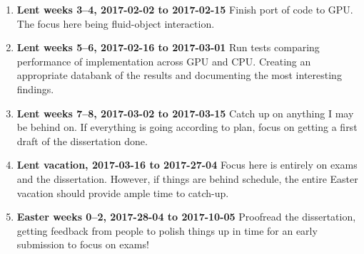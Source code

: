 \begin{enumerate}
\item \textbf{Lent weeks 3--4, 2017-02-02 to 2017-02-15} Finish port of code to
GPU. The focus here being fluid-object interaction.

\item \textbf{Lent weeks 5--6, 2017-02-16 to 2017-03-01} Run tests comparing
performance of implementation across GPU and CPU. Creating an appropriate
databank of the results and documenting the most interesting findings.

\item \textbf{Lent weeks 7--8, 2017-03-02 to 2017-03-15} Catch up on anything I
may be behind on. If everything is going according to plan, focus on getting a
first draft of the dissertation done.

\item \textbf{Lent vacation, 2017-03-16 to 2017-27-04} Focus here is entirely on
exams and the dissertation. However, if things are behind schedule, the entire
Easter vacation should provide ample time to catch-up.

\item \textbf{Easter weeks 0--2, 2017-28-04 to 2017-10-05} Proofread the
dissertation, getting feedback from people to polish things up in time for an
early submission to focus on exams!

\end{enumerate}